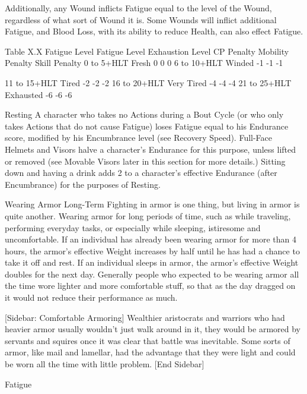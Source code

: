 \documentclass[oneside,11pt,english]{book}
\begin{document}
 

Additionally, any Wound inflicts Fatigue equal to the level of the Wound, regardless of what sort of 
Wound it is. Some Wounds will inflict additional Fatigue, and Blood Loss, with its ability to reduce 
Health, can also effect Fatigue. 

 

Table X.X Fatigue Level 
Fatigue Level Exhaustion Level CP Penalty Mobility Penalty Skill Penalty 
0 to 5+HLT Fresh 0 0 0 
6 to 10+HLT Winded -1 -1 -1 


11 to 15+HLT Tired -2 -2 -2 
16 to 20+HLT Very Tired -4 -4 -4 
21 to 25+HLT Exhausted -6 -6 -6 

 
Resting 
A character who takes no Actions during a Bout Cycle (or who only takes Actions that do not cause 
Fatigue) loses Fatigue equal to his Endurance score, modified by his Encumbrance level (see Recovery 
Speed). Full-Face Helmets and Visors halve a character’s Endurance for this purpose, unless lifted or 
removed (see Movable Visors later in this section for more details.) 
Sitting down and having a drink adds 2 to a character’s effective Endurance (after Encumbrance) for the 
purposes of Resting. 

 

Wearing Armor Long-Term 
Fighting in armor is one thing, but living in armor is quite another. Wearing armor for long periods of 
time, such as while traveling, performing everyday tasks, or especially while sleeping, istiresome and 
uncomfortable. 
If an individual has already been wearing armor for more than 4 hours, the armor’s effective Weight 
increases by half until he has had a chance to take it off and rest. 
If an individual sleeps in armor, the armor’s effective Weight doubles for the next day. 
Generally people who expected to be wearing armor all the time wore lighter and more comfortable stuff, 
so that as the day dragged on it would not reduce their performance as much. 

 

[Sidebar: Comfortable Armoring] 
Wealthier aristocrats and warriors who had heavier armor usually wouldn’t just walk around in it, they 
would be armored by servants and squires once it was clear that battle was inevitable. Some sorts of 
armor, like mail and lamellar, had the advantage that they were light and could be worn all the time with 
little problem. 
[End Sidebar] 
 

 

Fatigue 

 
\end{document}

